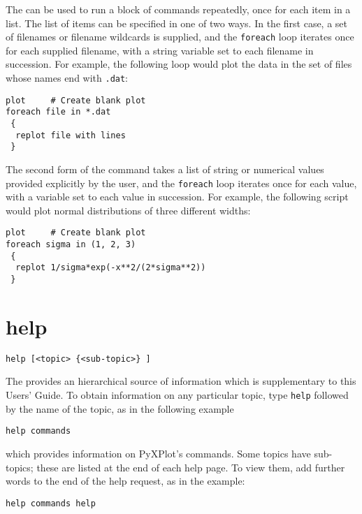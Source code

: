 The  can be used to run a block of commands repeatedly, once
for each item in a list.  The list of items can be specified in one of two
ways.  In the first case, a set of filenames or filename wildcards is supplied,
and the {\tt foreach} loop iterates once for each supplied filename, with a
string variable set to each filename in succession.  For example, the following
loop would plot the data in the set of files whose names end with {\tt .dat}:

\begin{verbatim}
plot     # Create blank plot
foreach file in *.dat
 {
  replot file with lines
 }
\end{verbatim}

The second form of the command takes a list of string or numerical values
provided explicitly by the user, and the {\tt foreach} loop iterates once for
each value, with a variable set to each value in succession.  For example, the
following script would plot normal distributions of three different widths:

\begin{verbatim}
plot     # Create blank plot
foreach sigma in (1, 2, 3)
 {
  replot 1/sigma*exp(-x**2/(2*sigma**2))
 }
\end{verbatim}


\section{help}

\begin{verbatim}
help [<topic> {<sub-topic>} ]
\end{verbatim}

The  provides an hierarchical source of information which is
supplementary to this Users' Guide.  To obtain information on any particular
topic, type {\tt help} followed by the name of the topic, as in the following
example

\begin{verbatim}
help commands
\end{verbatim}

\noindent which provides information on PyXPlot's commands. Some topics have
sub-topics; these are listed at the end of each help page. To view them, add
further words to the end of the help request, as in the example:

\begin{verbatim}
help commands help
\end{verbatim}

